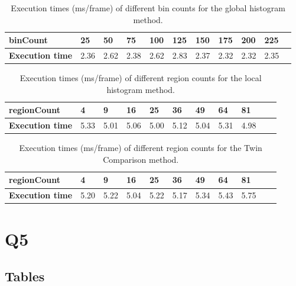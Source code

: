 \begin{appendices}
\begin{table}[!ht]
\caption{Execution times (ms/frame) of different bin counts for the global histogram method.}
\label{execGlobal}
\begin{tabular}{|l|l|l|l|l|l|l|l|l|l|l|}
\hline
\textbf{binCount}       & \textbf{25} & \textbf{50} & \textbf{75} & \textbf{100} & \textbf{125} & \textbf{150} & \textbf{175} & \textbf{200} & \textbf{225}  \\ \hline
\textbf{Execution time} & 2.36       & 2.62     & 2.38       & 2.62      & 2.83      & 2.37      & 2.32      & 2.32      & 2.35       \\ \hline
\end{tabular}
\end{table}

\begin{table}[!ht]
\caption{Execution times (ms/frame) of different region counts for the local histogram method.}
\label{execLocal}
\begin{tabular}{|l|l|l|l|l|l|l|l|l|l|l|}
\hline
\textbf{regionCount}    & \textbf{4} & \textbf{9} & \textbf{16} & \textbf{25} &\textbf{36}  & \textbf{49} & \textbf{64} & \textbf{81} \\ \hline
\textbf{Execution time} & 5.33    & 5.01     & 5.06     & 5.00     & 5.12     & 5.04     & 5.31     & 4.98     \\ \hline
\end{tabular}
\end{table}

\begin{table}[!ht]
\caption{Execution times (ms/frame) of different region counts for the Twin Comparison method.}
\label{twincomp}
\begin{tabular}{|l|l|l|l|l|l|l|l|l|l|l|}
\hline
\textbf{regionCount}    & \textbf{4} & \textbf{9} & \textbf{16} & \textbf{25} & \textbf{36} & \textbf{49} & \textbf{64} & \textbf{81} \\ \hline
\textbf{Execution time} & 5.20   & 5.22    & 5.04     & 5.22     & 5.17     & 5.34     & 5.43  & 5.75    \\ \hline
\end{tabular}
\end{table}

\section{Q5}\label{app:q5}
\subsection{Tables}


\end{appendices}
